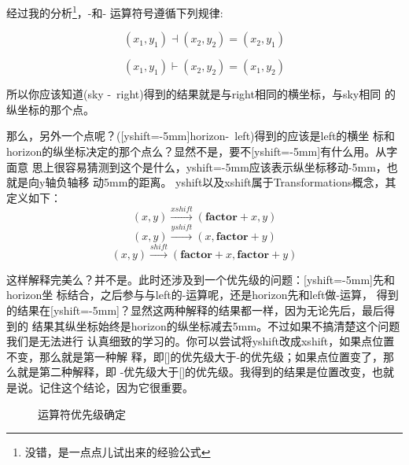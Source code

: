 \documentclass[10pt,a4paper,titlepage]{article}
\begin{document}
经过我的分析\footnote{没错，是一点点儿试出来的经验公式}，-\textbar 和\textbar -
运算符号遵循下列规律:

\begin{equation}
(x_1,y_1) \dashv (x_2,y_2) = (x_2,y_1)
\end{equation}

\begin{equation}
(x_1,y_1) \vdash (x_2,y_2) = (x_1,y_2)
\end{equation}

所以你应该知道(sky -\textbar ~right)得到的结果就是与right相同的横坐标，与sky相同
的纵坐标的那个点。

那么，另外一个点呢？([yshift=-5mm]horizon-\textbar ~left)得到的应该是left的横坐
标和horizon的纵坐标决定的那个点么？显然不是，要不[yshift=-5mm]有什么用。从字面意
思上很容易猜测到这个是什么，yshift=-5mm应该表示纵坐标移动-5mm，也就是向y轴负轴移
动5mm的距离。
yshift以及xshift属于Transformations概念，其定义如下：
\begin{equation}
(x,y) \stackrel{xshift}{\longrightarrow}(\textbf{factor}+x,y)
\end{equation}
\begin{equation}
(x,y) \stackrel{yshift}{\longrightarrow}(x,\mathbf{factor}+y)
\end{equation}
\begin{equation}
(x,y) \stackrel{shift}{\longrightarrow}(\textbf{factor}+x,\mathbf{factor}+y)
\end{equation}



这样解释完美么？并不是。此时还涉及到一个优先级的问题：[yshift=-5mm]先和horizon坐
标结合，之后参与与left的-\textbar 运算呢，还是horizon先和left做-\textbar 运算，
得到的结果在[yshift=-5mm]？显然这两种解释的结果都一样，因为无论先后，最后得到的
结果其纵坐标始终是horizon的纵坐标减去5mm。不过如果不搞清楚这个问题我们是无法进行
认真细致的学习的。你可以尝试将yshift改成xshift，如果点位置不变，那么就是第一种解
释，即[]的优先级大于-\textbar 的优先级；如果点位置变了，那么就是第二种解释，即
-\textbar 优先级大于[]的优先级。我得到的结果是位置改变，也就是说。记住这个结论，因为它很重要。

\begin{figure}[htbp]
\centering
{}
\caption{运算符优先级确定}
\end{figure}
\end{document}
